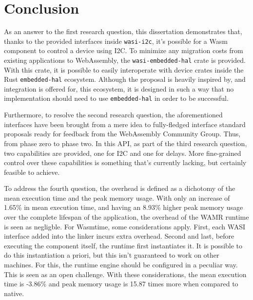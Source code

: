 \chapter*{Conclusion}

%

As an answer to the first research question, this dissertation demonstrates that, thanks to the provided interfaces inside \texttt{wasi-i2c}, it's possible for a \gls{Wasm} component to control a device using \gls{I2C}. To minimize any migration costs from existing applications to WebAssembly, the \texttt{wasi-embedded-hal} crate is provided. With this crate, it is possible to easily interoperate with device crates inside the Rust \texttt{embedded-hal} ecosystem. Although the proposal is heavily inspired by, and integration is offered for, this ecosystem, it is designed in such a way that no implementation should need to use \texttt{embedded-hal} in order to be successful.

Furthermore, to resolve the second research question, the aforementioned interfaces have been brought from a mere idea to fully-fledged interface standard proposals ready for feedback from the WebAssembly Community Group. Thus, from phase zero to phase two. In this \gls{API}, as part of the third research question, two capabilities are provided, one for I2C and one for delays. More fine-grained control over these capabilities is something that's currently lacking, but certainly feasible to achieve. 

To address the fourth question, the overhead is defined as a dichotomy of the mean execution time and the peak memory usage. With only an increase of 1.65\% in mean execution time, and having an 8.93\% higher peak memory usage over the complete lifespan of the application, the overhead of the \gls{WAMR} runtime is seen as negligble. For Wasmtime, some considerations apply. First, each \gls{WASI} interface added into the linker incurs extra overhead. Second and last, before executing the component itself, the runtime first instantiates it. It is possible to do this instantiation a priori, but this isn't guaranteed to work on other machines. For this, the runtime engine should be configured in a peculiar way. This is seen as an open challenge. With these considerations, the mean execution time is -3.86\% and peak memory usage is 15.87 times more when compared to native. 

